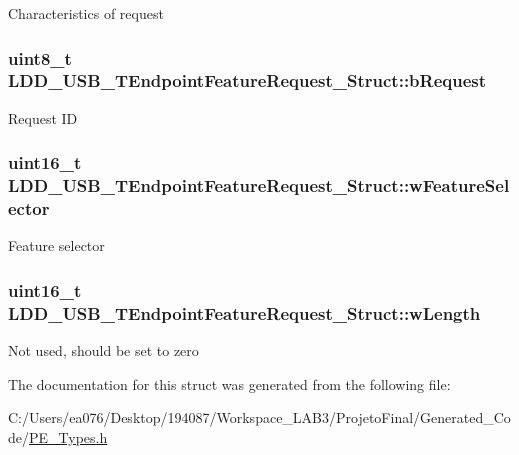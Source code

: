Characteristics of request \hypertarget{struct_l_d_d___u_s_b___t_endpoint_feature_request___struct_acd2dcd4a8762d22f84cfe3b9d9607a25}{
\subsubsection[{b\-Request}]{\setlength{\rightskip}{0pt plus 5cm}uint8\-\_\-t L\-D\-D\-\_\-\-U\-S\-B\-\_\-\-T\-Endpoint\-Feature\-Request\-\_\-\-Struct\-::b\-Request}}\label{struct_l_d_d___u_s_b___t_endpoint_feature_request___struct_acd2dcd4a8762d22f84cfe3b9d9607a25}
Request I\-D \hypertarget{struct_l_d_d___u_s_b___t_endpoint_feature_request___struct_aa026e7ce420430dc65a72dcc10337553}{
\subsubsection[{w\-Feature\-Selector}]{\setlength{\rightskip}{0pt plus 5cm}uint16\-\_\-t L\-D\-D\-\_\-\-U\-S\-B\-\_\-\-T\-Endpoint\-Feature\-Request\-\_\-\-Struct\-::w\-Feature\-Selector}}\label{struct_l_d_d___u_s_b___t_endpoint_feature_request___struct_aa026e7ce420430dc65a72dcc10337553}
Feature selector \hypertarget{struct_l_d_d___u_s_b___t_endpoint_feature_request___struct_aec7dc034039bc4deb5c811afac0686a5}{
\subsubsection[{w\-Length}]{\setlength{\rightskip}{0pt plus 5cm}uint16\-\_\-t L\-D\-D\-\_\-\-U\-S\-B\-\_\-\-T\-Endpoint\-Feature\-Request\-\_\-\-Struct\-::w\-Length}}\label{struct_l_d_d___u_s_b___t_endpoint_feature_request___struct_aec7dc034039bc4deb5c811afac0686a5}
Not used, should be set to zero 

The documentation for this struct was generated from the following file\-:\begin{DoxyCompactItemize}
\item 
C\-:/\-Users/ea076/\-Desktop/194087/\-Workspace\-\_\-\-L\-A\-B3/\-Projeto\-Final/\-Generated\-\_\-\-Code/\hyperlink{_p_e___types_8h}{P\-E\-\_\-\-Types.\-h}\end{DoxyCompactItemize}
